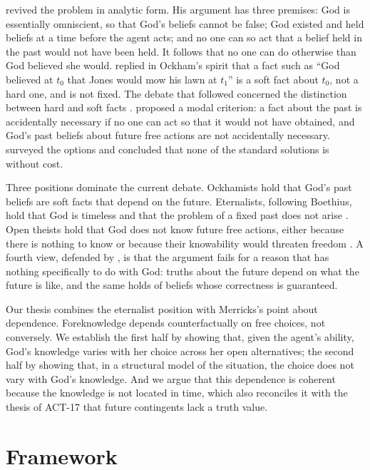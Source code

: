 \documentclass{situationist-preprint}
\begin{document}
\citet{Pike1965} revived the problem in analytic form. His argument has three premises: God is essentially omniscient, so that God's beliefs cannot be false; God existed and held beliefs at a time before the agent acts; and no one can so act that a belief held in the past would not have been held. It follows that no one can do otherwise than God believed she would. \citet{Adams1967} replied in Ockham's spirit that a fact such as \enquote{God believed at $t_0$ that Jones would mow his lawn at $t_1$} is a soft fact about $t_0$, not a hard one, and is not fixed. The debate that followed concerned the distinction between hard and soft facts \citep{Fischer1989}. \citet{Plantinga1986} proposed a modal criterion: a fact about the past is accidentally necessary if no one can act so that it would not have obtained, and God's past beliefs about future free actions are not accidentally necessary. \citet{Zagzebski1991} surveyed the options and concluded that none of the standard solutions is without cost.

Three positions dominate the current debate. Ockhamists hold that God's past beliefs are soft facts that depend on the future. Eternalists, following Boethius, hold that God is timeless and that the problem of a fixed past does not arise \citep{StumpKretzmann1981}. Open theists hold that God does not know future free actions, either because there is nothing to know or because their knowability would threaten freedom \citep{Hasker1989}. A fourth view, defended by \citet{Merricks2009}, is that the argument fails for a reason that has nothing specifically to do with God: truths about the future depend on what the future is like, and the same holds of beliefs whose correctness is guaranteed.

Our thesis combines the eternalist position with Merricks's point about dependence. Foreknowledge depends counterfactually on free choices, not conversely. We establish the first half by showing that, given the agent's ability, God's knowledge varies with her choice across her open alternatives; the second half by showing that, in a structural model of the situation, the choice does not vary with God's knowledge. And we argue that this dependence is coherent because the knowledge is not located in time, which also reconciles it with the thesis of ACT-17 that future contingents lack a truth value.

\section{Framework}
\end{document}
